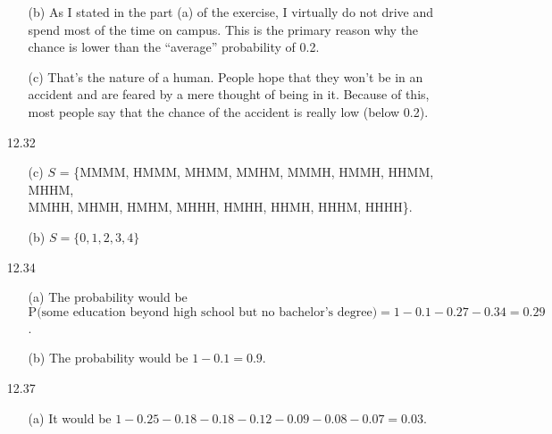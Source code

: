 \documentclass[11pt, a4paper]{article}
\begin{document}
\begin{itemize}
\begin{itemize}
\item[]

\item[(b)]
As I stated in the part (a) of the exercise, I virtually do not drive and spend most of the time on campus.
This is the primary reason why the chance is lower than the ``average'' probability of 0.2.

\item[]

\item[(c)]
That's the nature of a human. People hope that they won't be in an accident and are feared by a mere thought
of being in it. Because of this, most people say that the chance of the accident is really low (below 0.2).
\end{itemize}

\item[]
\item[]

\item[12.32]
\begin{itemize}
\item[(c)]
$S$ = \{MMMM, HMMM, MHMM, MMHM, MMMH, HMMH, HHMM, MHHM,\\
MMHH, MHMH, HMHM, MHHH, HMHH, HHMH, HHHM, HHHH\}.

\item[]

\item[(b)]
$S = \{0, 1, 2, 3, 4\}$
\end{itemize}

\item[]
\item[]

\item[12.34]
\begin{itemize}
\item[(a)]
The probability would be $\text{P$($some education beyond high school but no bachelor's degree$)$} = 1 - 0.1 - 0.27 - 0.34 = 0.29$.

\item[]

\item[(b)]
The probability would be $1 - 0.1 = 0.9$.
\end{itemize}

\item[]
\item[]

\item[12.37]
\begin{itemize}
\item[(a)]
It would be $1 - 0.25 - 0.18 - 0.18 - 0.12 - 0.09 - 0.08 - 0.07 = 0.03$.
\item[]


\end{itemize}
\end{itemize}
\end{document}
